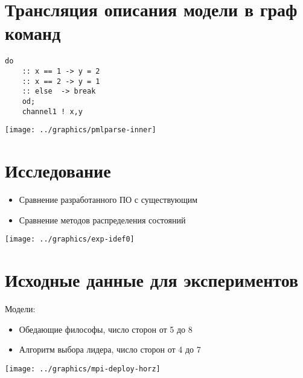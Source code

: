 \documentclass[12pt]{article}
\begin{document}
\section{Трансляция описания модели в граф команд}
\label{sec:pmlparse}

\begin{minipage}[m]{0.35\linewidth}
  \begin{lstlisting}[language=Promela,style=simplecode,numbers=none]
    do
    :: x == 1 -> y = 2
    :: x == 2 -> y = 1
    :: else  -> break
    od;
    channel1 ! x,y
  \end{lstlisting}
\end{minipage}
\begin{minipage}[m]{0.75\linewidth}
  \texttt{[image: ../graphics/pmlparse-inner]}
\end{minipage}

\section{Исследование}
\label{sec:experim}

\begin{itemize}
\item Сравнение разработанного ПО с существующим
\item Сравнение методов распределения состояний
\end{itemize}

\begin{center}
  \texttt{[image: ../graphics/exp-idef0]}
\end{center}

\section{Исходные данные для экспериментов}
\label{sec:experim-input}

\begin{minipage}[t]{0.15\linewidth}
Модели:  
\end{minipage}
\begin{minipage}[t]{0.85\linewidth}
  \begin{itemize}
  \item Обедающие философы, число сторон от 5 до 8
  \item Алгоритм выбора лидера, число сторон от 4 до 7
  \end{itemize}

\end{minipage}
\begin{center}
  \texttt{[image: ../graphics/mpi-deploy-horz]}
\end{center}
\end{document}

